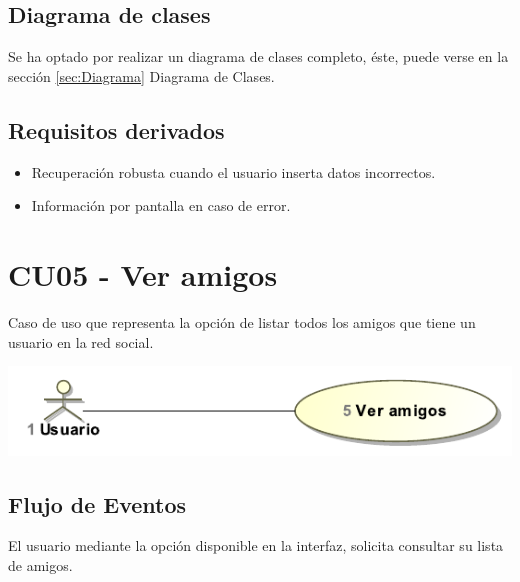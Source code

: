 \documentclass[12pt, a4paper, titlepage]{article}
\begin{document}
\subsection{Diagrama de clases}
Se ha optado por realizar un diagrama de clases completo, éste, puede verse en la sección \ref{sec:Diagrama} Diagrama de Clases.
\subsection{Requisitos derivados}

\begin{itemize}
	\item Recuperación robusta cuando el usuario inserta datos incorrectos.
	\item Información por pantalla en caso de error.
\end{itemize}

\section{CU05 - Ver amigos}


Caso de uso que representa la opción de listar todos los amigos que tiene un usuario en la red social.

\begin{center}
	\includegraphics{Imagenes/VerAmigosCU.pdf}
\end{center}
\subsection{Flujo de Eventos}

El usuario mediante la opción disponible en la interfaz, solicita consultar su lista de amigos.
\end{document}
